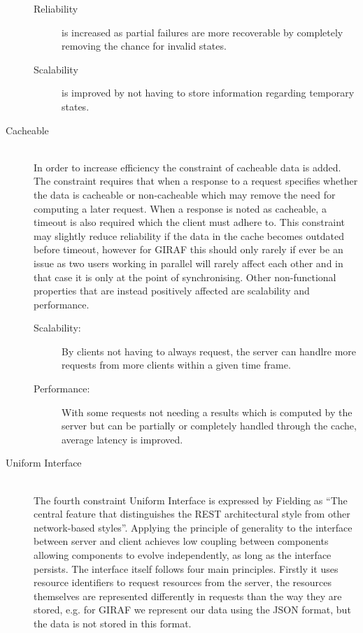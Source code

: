 \begin{description}
\begin{description}
        \item[Reliability] is increased as partial failures are more recoverable by completely removing the chance for invalid states.
        \item[Scalability] is improved by not having to store information regarding temporary states.
    \end{description}
    \item [Cacheable] \hfill \\
    In order to increase efficiency the constraint of cacheable data is added.
    The constraint requires that when a response to a request specifies whether the data is cacheable or non-cacheable which may remove the need for computing a later request.
    When a response is noted as cacheable, a timeout is also required which the client must adhere to.
    This constraint may slightly reduce reliability if the data in the cache becomes outdated before timeout, however for GIRAF this should only rarely if ever be an issue as two users working in parallel will rarely affect each other and in that case it is only at the point of synchronising.
    Other non-functional properties that are instead positively affected are scalability and performance.
    \begin{description}
        \item[Scalability:] By clients not having to always request, the server can handlre more requests from more clients within a given time frame.
        \item[Performance:] With some requests not needing a results which is computed by the server but can be partially or completely handled through the cache, average latency is improved.
    \end{description}
    \item [Uniform Interface] \hfill \\
    The fourth constraint Uniform Interface is expressed by Fielding as \enquote{The central feature that distinguishes the REST architectural style from other network-based styles}\citep{fielding2000rest}.
    Applying the principle of generality to the interface between server and client achieves low coupling between components allowing components to evolve independently, as long as the interface persists.
    The interface itself follows four main principles.
    Firstly it uses resource identifiers to request resources from the server, the resources themselves are represented differently in requests than the way they are stored, e.g. for GIRAF we represent our data using the JSON format, but the data is not stored in this format.

\end{description}
